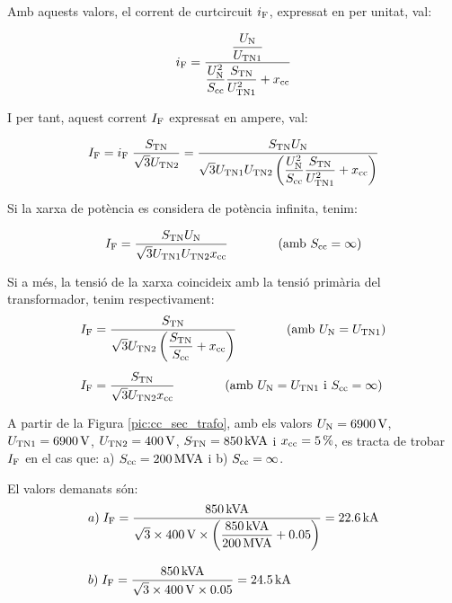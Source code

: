 Amb aquests valors, el corrent de curtcircuit $i_\mathrm{F}$, expressat
en per unitat, val:

\begin{equation}
    i_\mathrm{F} = \frac{\dfrac{U_\mathrm{N}}{U_\mathrm{TN1}}}{\dfrac{U_\mathrm{N}^2}{S_\mathrm{cc}}
    \dfrac{S_\mathrm{TN}}{U_\mathrm{TN1}^2} + x_\mathrm{cc}}
\end{equation}

I per tant, aquest corrent $I_\mathrm{F}$ expressat en ampere, val:

\begin{equation}
    I_\mathrm{F} = i_\mathrm{F}\; \frac{S_\mathrm{TN}}{\sqrt{3}U_\mathrm{TN2}} =
    \frac{S_\mathrm{TN} U_\mathrm{N}}{\sqrt{3} U_\mathrm{TN1}U_\mathrm{TN2}
    \left(\dfrac{U_\mathrm{N}^2}{S_\mathrm{cc}}
    \dfrac{S_\mathrm{TN}}{U_\mathrm{TN1}^2} + x_\mathrm{cc}\right)}
\end{equation}

Si la xarxa de potència es considera de potència infinita, tenim:

\begin{equation}
    I_\mathrm{F} = \frac{S_\mathrm{TN} U_\mathrm{N}}{\sqrt{3} U_\mathrm{TN1}U_\mathrm{TN2}
    x_\mathrm{cc}}\qquad\qquad (\text{amb }S_\mathrm{cc}=\infty)
\end{equation}

Si a més, la tensió de la xarxa coincideix amb la tensió primària
del transformador, tenim respectivament:
\begin{align}
    I_\mathrm{F} &= \frac{S_\mathrm{TN}}{\sqrt{3} U_\mathrm{TN2}
    \left(\dfrac{S_\mathrm{TN}}{S_\mathrm{cc}} +
    x_\mathrm{cc}\right)}\qquad\qquad(\text{amb }U_\mathrm{N}=U_\mathrm{TN1})\\[1ex]
    I_\mathrm{F} &= \frac{S_\mathrm{TN}}{\sqrt{3} U_\mathrm{TN2}
    x_\mathrm{cc}}\qquad\qquad(\text{amb }U_\mathrm{N}=U_\mathrm{TN1}\text{ i }
    S_\mathrm{cc}=\infty)
\end{align}

\begin{exemple}
    A partir de la Figura \vref{pic:cc_sec_trafo}, amb els valors
    $U_\mathrm{N}=\SI{6900}{V}$, $U_\mathrm{TN1}=\SI{6900}{V}$,
    $U_\mathrm{TN2}=\SI{400}{V}$, $S_\mathrm{TN}=\SI{850}{kVA}$ i
    $x_\mathrm{cc}=\SI{5}{\percent}$, es tracta de trobar $I_\mathrm{F}$ en el cas
    que: a) $S_\mathrm{cc}=\SI{200}{MVA}$ i b) $S_\mathrm{cc}=\infty$.

    El valors demanats són:
    \begin{align*}
       &a)\;I_\mathrm{F} = \frac{\SI{850}{kVA}}{\sqrt{3}\times \SI{400}{V}\times
       \left(\dfrac{\SI{850}{kVA}}{\SI{200}{MVA}} +
       \num{0,05}\right)} = \SI{22,6}{kA} \\[2ex]
       &b)\;I_\mathrm{F} = \frac{\SI{850}{kVA}}{\sqrt{3}\times \SI{400}{V}\times
       \num{0,05}} = \SI{24,5}{kA}
    \end{align*}

\end{exemple}



